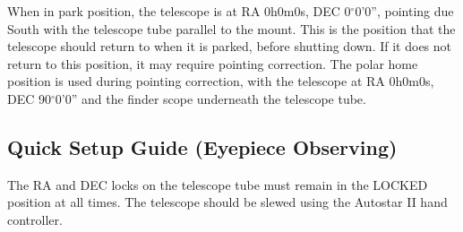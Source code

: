 \documentclass[12pt,titlepage]{article}
\renewcommand\deg{\mbox{$^\circ$}}
\begin{document}
When in park position, the telescope is at RA 0h0m0s, DEC 0$\deg$0'0'', pointing due South with the telescope tube parallel to the mount.
This is the position that the telescope should return to when it is parked, before shutting down.
If it does not return to this position, it may require pointing correction.
The polar home position is used during pointing correction, with the telescope at RA 0h0m0s, DEC 90$\deg$0'0'' and the finder scope underneath the telescope tube.

\subsection{Quick Setup Guide (Eyepiece Observing)} \label{ssec:betsy_quick}
The RA and DEC locks on the telescope tube must remain in the LOCKED position at all times. The telescope should be slewed using the Autostar II hand controller.
\end{document}

